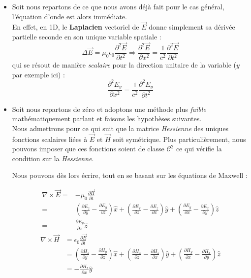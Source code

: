\begin{itemize}
	\item
Soit nous repartons de ce que nous avons déjà fait pour le cas général, l'équation d'onde est alors immédiate. \\
En effet, en 1D, le \textbf{Laplacien} vectoriel de $\vec{E}$ donne simplement sa dérivée partielle seconde en son unique variable
spatiale : 
\[ \Delta \vec{E} = \mu_{0} \epsilon_{0}  \frac{\partial^{2} \vec{E}}{\partial t^{2}} \Rightarrow \frac{\partial^{2} \vec{E} }{\partial x^2} = \frac{1}{c^{2}}  \frac{\partial^{2} \vec{E}}{\partial t^{2}}\]
qui se résout de manière \textit{scalaire} pour la direction unitaire de la variable ($y$ par exemple ici) : 
\[\frac{\partial^{2} E_{y}}{\partial x^{2}} = \frac{1}{c^{2}}  \frac{\partial^{2} E_{y}}{\partial t^{2}}\]


\item Soit nous repartons de zéro et adoptons une méthode plus \textit{faible} mathématiquement parlant et faisons les hypothèses suivantes.\\
Nous admettrons pour ce qui suit que la matrice \textit{Hessienne} des uniques fonctions scalaires liées à $\vec{E}$ et $\vec{H}$ soit symétrique. 
Plus particulièrement, nous pouvons imposer que ces fonctions soient de classe $\mathcal{C}^{2}$ ce qui vérifie la condition sur la \textit{Hessienne}.

Nous pouvons dès lors écrire, tout en se basant sur les équations de Maxwell : 


\begin{equation*}
	\begin{split}
\nabla \times \vec{E} =& -\mu_{0} \frac{\partial \vec{H}}{\partial t} \\=& (\frac{\partial E_{z}}{\partial y} - \frac{\partial E_{y}}{\partial z})\hat{x} +   (\frac{\partial E_{x}}{\partial z} - \frac{\partial E_{z}}{\partial x})\hat{y} +
(\frac{\partial E_{y}}{\partial x} - \frac{\partial E_{x}}{\partial y})\hat{z} \\=& \frac{\partial E_{y}}{\partial x} \hat{z}
	\end{split}
\end{equation*}
\begin{equation*}
\begin{split}
\nabla \times \vec{H} &= \epsilon_{0} \frac{\partial \vec{E}}{\partial t} \\&= (\frac{\partial H_{z}}{\partial y} - \frac{\partial H_{y}}{\partial z})\hat{x} +   (\frac{\partial H_{x}}{\partial z} - \frac{\partial H_{z}}{\partial x})\hat{y} +
(\frac{\partial H_{y}}{\partial x} - \frac{\partial H_{x}}{\partial y})\hat{z} \\&= -\frac{\partial H_{z}}{\partial x} \hat{y}
	\end{split}
\end{equation*}


\end{itemize}
